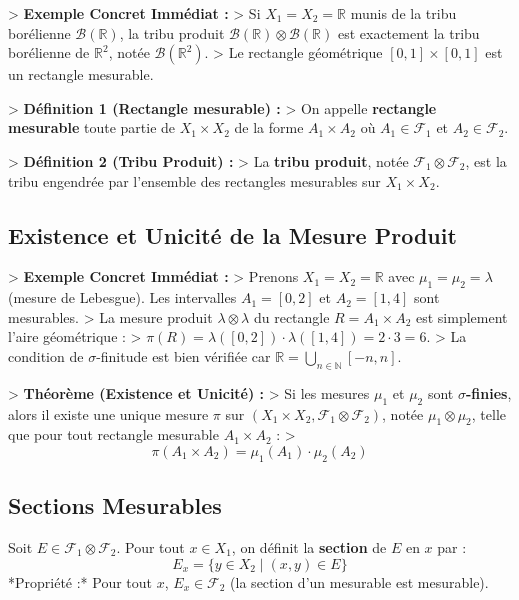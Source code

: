 \documentclass[11pt,a4paper]{article}
\begin{document}
> \textbf{Exemple Concret Immédiat :}
> Si $X_1 = X_2 = \mathbb{R}$ munis de la tribu borélienne $\mathcal{B}(\mathbb{R})$, la tribu produit $\mathcal{B}(\mathbb{R}) \otimes \mathcal{B}(\mathbb{R})$ est exactement la tribu borélienne de $\mathbb{R}^2$, notée $\mathcal{B}(\mathbb{R}^2)$.
> Le rectangle géométrique $[0, 1] \times [0, 1]$ est un rectangle mesurable.


> \textbf{Définition 1 (Rectangle mesurable) :}
> On appelle \textbf{rectangle mesurable} toute partie de $X_1 \times X_2$ de la forme $A_1 \times A_2$ où $A_1 \in \mathcal{F}_1$ et $A_2 \in \mathcal{F}_2$.

> \textbf{Définition 2 (Tribu Produit) :}
> La \textbf{tribu produit}, notée $\mathcal{F}_1 \otimes \mathcal{F}_2$, est la tribu engendrée par l'ensemble des rectangles mesurables sur $X_1 \times X_2$.

\subsection{Existence et Unicité de la Mesure Produit}

> \textbf{Exemple Concret Immédiat :}
> Prenons $X_1 = X_2 = \mathbb{R}$ avec $\mu_1 = \mu_2 = \lambda$ (mesure de Lebesgue). Les intervalles $A_1 = [0, 2]$ et $A_2 = [1, 4]$ sont mesurables.
> La mesure produit $\lambda \otimes \lambda$ du rectangle $R = A_1 \times A_2$ est simplement l'aire géométrique :
> $\pi(R) = \lambda([0, 2]) \cdot \lambda([1, 4]) = 2 \cdot 3 = 6$.
> La condition de $\sigma$-finitude est bien vérifiée car $\mathbb{R} = \bigcup_{n \in \mathbb{N}} [-n, n]$.


> \textbf{Théorème (Existence et Unicité) :}
> Si les mesures $\mu_1$ et $\mu_2$ sont \textbf{$\sigma$-finies}, alors il existe une unique mesure $\pi$ sur $(X_1 \times X_2, \mathcal{F}_1 \otimes \mathcal{F}_2)$, notée $\mu_1 \otimes \mu_2$, telle que pour tout rectangle mesurable $A_1 \times A_2$ :
> $$\pi(A_1 \times A_2) = \mu_1(A_1) \cdot \mu_2(A_2)$$

\subsection{Sections Mesurables}

Soit $E \in \mathcal{F}_1 \otimes \mathcal{F}_2$. Pour tout $x \in X_1$, on définit la \textbf{section} de $E$ en $x$ par :
$$E_x = \{ y \in X_2 \mid (x, y) \in E \}$$
*Propriété :* Pour tout $x$, $E_x \in \mathcal{F}_2$ (la section d'un mesurable est mesurable).
\end{document}
